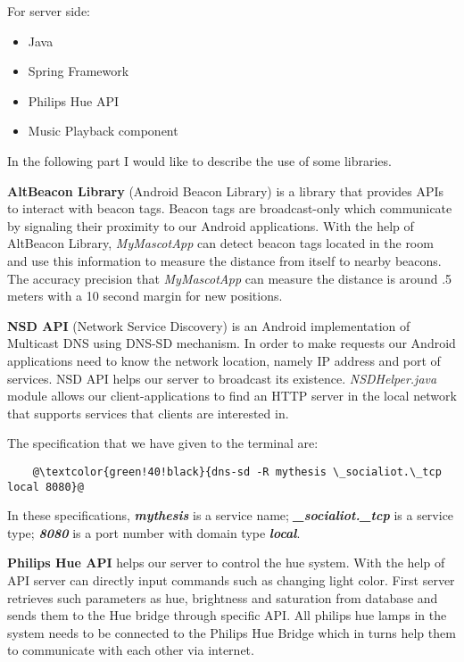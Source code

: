 For server side:
\begin{itemize}
    \item Java
    \item Spring Framework
    \item Philips Hue API
    \item Music Playback component
\end{itemize}

In the following part I would like to describe the use of some libraries.

\textbf{AltBeacon Library} (Android Beacon Library) is a library that provides APIs to interact with beacon tags.
Beacon tags are broadcast-only which communicate by signaling their proximity to our Android applications.
With the help of AltBeacon Library, \emph{MyMascotApp} can detect beacon tags located in the room
and use this information to measure the distance from itself to nearby beacons.
The accuracy precision that \emph{MyMascotApp} can measure the distance is around .5 meters
with a 10 second margin for new positions.

\textbf{NSD API} (Network Service Discovery) is an Android implementation of Multicast DNS using DNS-SD mechanism.
In order to make requests our Android applications need to know the network location,
namely IP address and port of services.
NSD API helps our server to broadcast its existence.
\emph{NSDHelper.java} module allows our client-applications to find an HTTP server in the local network that supports
services that clients are interested in.

The specification that we have given to the terminal are:
\begin{lstlisting}
    @\textcolor{green!40!black}{dns-sd -R mythesis \_socialiot.\_tcp local 8080}@
\end{lstlisting}
In these specifications, \textbf{\emph{mythesis}} is a service name;
\textbf{\emph{\_socialiot.\_tcp}} is a service type;
\textbf{\emph{8080}} is a port number with domain type \textbf{\emph{local}}.

\textbf{Philips Hue API} helps our server to control the hue system.
With the help of API server can directly input commands such as changing light color.
First server retrieves such parameters as hue, brightness and saturation from database and sends them
to the Hue bridge through specific API\@.
All philips hue lamps in the system needs to be connected to the Philips Hue Bridge which in turns help them
to communicate with each other via internet.

